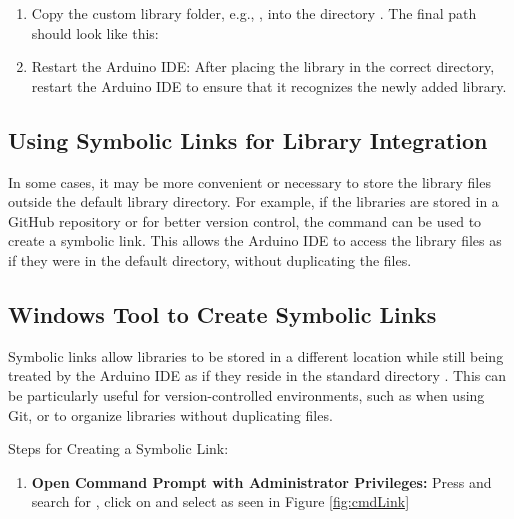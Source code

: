 {\begin{enumerate}
	\medskip
	
	{\small{}}
	
	\item Copy the custom library folder, e.g., , into the  directory . The final path should look like this:
	
	\medskip
	
	{\small{}}
	
	\item Restart the Arduino IDE: After placing the library in the correct directory, restart the Arduino IDE to ensure that it recognizes the newly added library.
	
\end{enumerate}





\subsection{Using Symbolic Links for Library Integration}

In some cases, it may be more convenient or necessary to store the library files outside the default library directory. For example, if the libraries are stored in a GitHub repository or for better version control, the command  can be used to create a symbolic link. This allows the Arduino IDE to access the library files as if they were in the default directory, without duplicating the files.


\subsection{Windows Tool  to Create Symbolic Links}

Symbolic links allow libraries to be stored in a different location while still being treated by the Arduino IDE as if they reside in the standard directory . This can be particularly useful for version-controlled environments, such as when using Git, or to organize libraries without duplicating files.

Steps for Creating a Symbolic Link:



\begin{enumerate}



\item \textbf{Open Command Prompt with Administrator Privileges:} Press  and search for , click on  and select  as seen in Figure \ref{fig:cmdLink}


\end{enumerate}}
